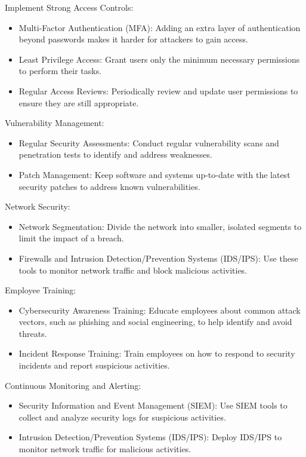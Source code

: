 Implement Strong Access Controls:
\begin{itemize}
    \item Multi-Factor Authentication (MFA): Adding an extra layer of authentication beyond passwords makes it harder for attackers to gain access.
    \item Least Privilege Access: Grant users only the minimum necessary permissions to perform their tasks.
    \item Regular Access Reviews: Periodically review and update user permissions to ensure they are still appropriate.
\end{itemize}

Vulnerability Management:
\begin{itemize}
    \item Regular Security Assessments: Conduct regular vulnerability scans and penetration tests to identify and address weaknesses.
    \item Patch Management: Keep software and systems up-to-date with the latest security patches to address known vulnerabilities.

\end{itemize}

Network Security:
\begin{itemize}
    \item Network Segmentation: Divide the network into smaller, isolated segments to limit the impact of a breach.
    \item Firewalls and Intrusion Detection/Prevention Systems (IDS/IPS): Use these tools to monitor network traffic and block malicious activities.
\end{itemize}

Employee Training:
\begin{itemize}
    \item Cybersecurity Awareness Training: Educate employees about common attack vectors, such as phishing and social engineering, to help identify and avoid threats.
    \item Incident Response Training: Train employees on how to respond to security incidents and report suspicious activities.
\end{itemize}

Continuous Monitoring and Alerting:
\begin{itemize}
    \item Security Information and Event Management (SIEM): Use SIEM tools to collect and analyze security logs for suspicious activities.
    \item Intrusion Detection/Prevention Systems (IDS/IPS): Deploy IDS/IPS to monitor network traffic for malicious activities.
\end{itemize}

